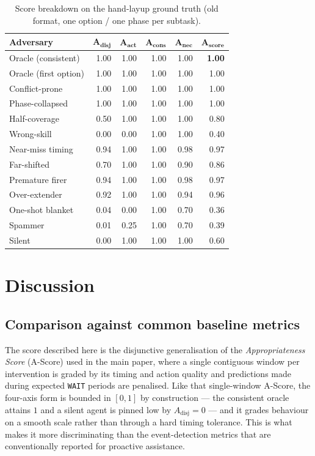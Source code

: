 \documentclass[11pt]{article}
\newcommand{\Score}{A_{\text{score}}}
\newcommand{\Adisj}{A_{\text{disj}}}
\newcommand{\Aact}{A_{\text{act}}}
\newcommand{\Acons}{A_{\text{cons}}}
\newcommand{\Anec}{A_{\text{nec}}}
\begin{document}
\begin{table}[ht]
\centering
\small
\begin{tabular}{lrrrrr}
\toprule
\textbf{Adversary} & $\bm{\Adisj}$ & $\bm{\Aact}$ & $\bm{\Acons}$ & $\bm{\Anec}$ & $\bm{\Score}$ \\
\midrule
Oracle (consistent)   & 1.00 & 1.00 & 1.00 & 1.00 & \textbf{1.00} \\
Oracle (first option) & 1.00 & 1.00 & 1.00 & 1.00 & 1.00 \\
Conflict-prone        & 1.00 & 1.00 & 1.00 & 1.00 & 1.00 \\
Phase-collapsed       & 1.00 & 1.00 & 1.00 & 1.00 & 1.00 \\
Half-coverage         & 0.50 & 1.00 & 1.00 & 1.00 & 0.80 \\
Wrong-skill           & 0.00 & 0.00 & 1.00 & 1.00 & 0.40 \\
Near-miss timing      & 0.94 & 1.00 & 1.00 & 0.98 & 0.97 \\
Far-shifted           & 0.70 & 1.00 & 1.00 & 0.90 & 0.86 \\
Premature firer       & 0.94 & 1.00 & 1.00 & 0.98 & 0.97 \\
Over-extender         & 0.92 & 1.00 & 1.00 & 0.94 & 0.96 \\
One-shot blanket      & 0.04 & 0.00 & 1.00 & 0.70 & 0.36 \\
Spammer               & 0.01 & 0.25 & 1.00 & 0.70 & 0.39 \\
Silent                & 0.00 & 1.00 & 1.00 & 1.00 & 0.60 \\
\bottomrule
\end{tabular}
\caption{Score breakdown on the hand-layup ground truth (old format,
one option / one phase per subtask).}
\label{tab:layup}
\end{table}

\section{Discussion}

\subsection{Comparison against common baseline metrics}
\label{sec:baselines}

The score described here is the disjunctive generalisation of the
\emph{Appropriateness Score} (A-Score) used in the main paper, where a
single contiguous window per intervention is graded by its timing and
action quality and predictions made during expected \texttt{WAIT}
periods are penalised. Like that single-window A-Score, the four-axis
form is bounded in $[0, 1]$ by construction --- the consistent oracle
attains $1$ and a silent agent is pinned low by $\Adisj = 0$ --- and
it grades behaviour on a smooth scale rather than through a hard
timing tolerance. This is what makes it more discriminating than the
event-detection metrics that are conventionally reported for proactive
assistance.
\end{document}
